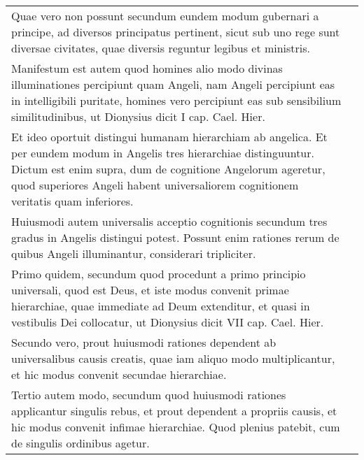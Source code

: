 \documentclass[10pt]{jsarticle} %
\begin{document}
\begin{longtable}{p{21em}p{21em}}
Quae vero non possunt secundum eundem modum
gubernari a principe, ad diversos principatus pertinent, sicut sub uno
rege sunt diversae civitates, quae diversis reguntur legibus et
ministris. 


&


\\

Manifestum est autem quod homines alio modo divinas
illuminationes percipiunt quam Angeli, nam Angeli percipiunt eas in
intelligibili puritate, homines vero percipiunt eas sub sensibilium
similitudinibus, ut Dionysius dicit I cap. Cael. Hier. 



&


\\

Et ideo
oportuit distingui humanam hierarchiam ab angelica. Et per eundem
modum in Angelis tres hierarchiae distinguuntur. Dictum est enim
supra, dum de cognitione Angelorum ageretur, quod superiores Angeli
habent universaliorem cognitionem veritatis quam inferiores. 


&


\\


Huiusmodi
autem universalis acceptio cognitionis secundum tres gradus in Angelis
distingui potest. Possunt enim rationes rerum de quibus Angeli
illuminantur, considerari tripliciter. 

&


\\


Primo quidem, secundum quod
procedunt a primo principio universali, quod est Deus, et iste modus
convenit primae hierarchiae, quae immediate ad Deum extenditur, et
quasi in vestibulis Dei collocatur, ut Dionysius dicit VII
cap. Cael. Hier. 


&


\\


Secundo vero, prout huiusmodi rationes dependent ab
universalibus causis creatis, quae iam aliquo modo multiplicantur, et
hic modus convenit secundae hierarchiae. 



&


\\

Tertio autem modo, secundum
quod huiusmodi rationes applicantur singulis rebus, et prout dependent
a propriis causis, et hic modus convenit infimae hierarchiae. Quod
plenius patebit, cum de singulis ordinibus agetur. 




\end{longtable}
\end{document}
